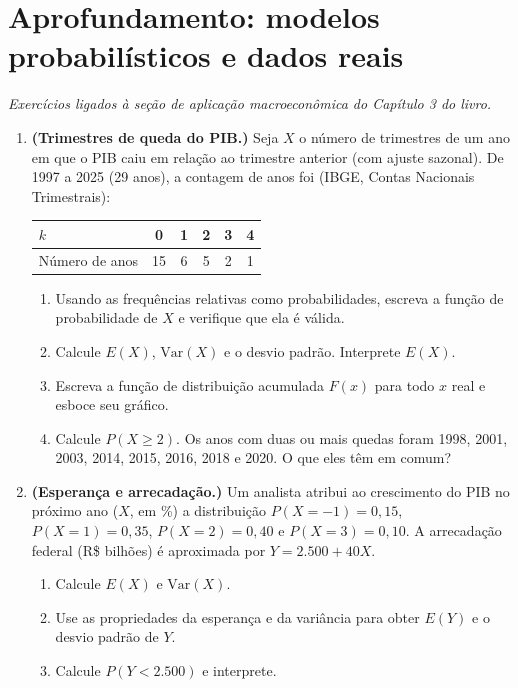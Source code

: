 \documentclass[11pt]{article}
\begin{document}
\bigskip
{}
\section*{Aprofundamento: modelos probabilísticos e dados reais}
\noindent\textit{Exercícios ligados à seção de aplicação macroeconômica do Capítulo 3 do livro.}

\begin{enumerate}[label=\textbf{A\arabic*.}, leftmargin=*]
\item \textbf{(Trimestres de queda do PIB.)} Seja $X$ o número de trimestres de um ano em que o PIB caiu em relação ao trimestre anterior
(com ajuste sazonal). De 1997 a 2025 (29 anos), a contagem de anos foi (IBGE, Contas Nacionais Trimestrais):
\begin{center}
\begin{tabular}{l|ccccc}
\toprule
$k$ & 0 & 1 & 2 & 3 & 4 \\
\midrule
Número de anos & 15 & 6 & 5 & 2 & 1 \\
\bottomrule
\end{tabular}
\end{center}
\begin{enumerate}[label=(\alph*)]
  \item Usando as frequências relativas como probabilidades, escreva a função de probabilidade de $X$ e verifique que ela é válida.
  \item Calcule $E(X)$, $\mathrm{Var}(X)$ e o desvio padrão. Interprete $E(X)$.
  \item Escreva a função de distribuição acumulada $F(x)$ para todo $x$ real e esboce seu gráfico.
  \item Calcule $P(X \geq 2)$. Os anos com duas ou mais quedas foram 1998, 2001, 2003, 2014, 2015, 2016, 2018 e 2020. O que eles têm em comum?
\end{enumerate}

\item \textbf{(Esperança e arrecadação.)} Um analista atribui ao crescimento do PIB no próximo ano ($X$, em \%) a distribuição
$P(X = -1) = 0{,}15$, $P(X = 1) = 0{,}35$, $P(X = 2) = 0{,}40$ e $P(X = 3) = 0{,}10$. A arrecadação federal (R\$ bilhões) é aproximada por
$Y = 2.500 + 40X$.
\begin{enumerate}[label=(\alph*)]
  \item Calcule $E(X)$ e $\mathrm{Var}(X)$.
  \item Use as propriedades da esperança e da variância para obter $E(Y)$ e o desvio padrão de $Y$.
  \item Calcule $P(Y < 2.500)$ e interprete.
\end{enumerate}

\end{enumerate}
\end{document}
